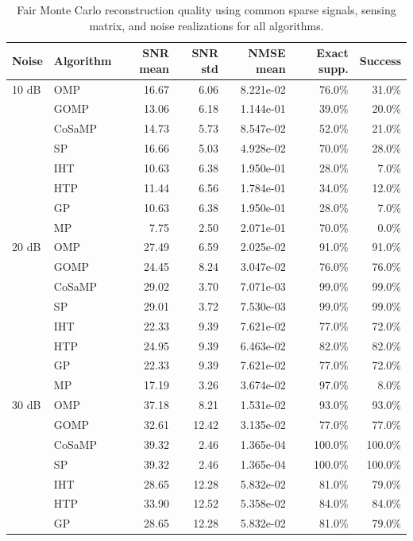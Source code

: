 \begin{table}[!t]
\centering
\caption{Fair Monte Carlo reconstruction quality using common sparse signals, sensing matrix, and noise realizations for all algorithms.}
\label{tab:fair_mc_quality}
\footnotesize
\begin{tabular}{llrrrrr}
\toprule
Noise & Algorithm & SNR mean & SNR std & NMSE mean & Exact supp. & Success \\
\midrule
10 dB & OMP & 16.67 & 6.06 & 8.221e-02 & 76.0\% & 31.0\% \\
 & GOMP & 13.06 & 6.18 & 1.144e-01 & 39.0\% & 20.0\% \\
 & CoSaMP & 14.73 & 5.73 & 8.547e-02 & 52.0\% & 21.0\% \\
 & SP & 16.66 & 5.03 & 4.928e-02 & 70.0\% & 28.0\% \\
 & IHT & 10.63 & 6.38 & 1.950e-01 & 28.0\% & 7.0\% \\
 & HTP & 11.44 & 6.56 & 1.784e-01 & 34.0\% & 12.0\% \\
 & GP & 10.63 & 6.38 & 1.950e-01 & 28.0\% & 7.0\% \\
 & MP & 7.75 & 2.50 & 2.071e-01 & 70.0\% & 0.0\% \\
\midrule
20 dB & OMP & 27.49 & 6.59 & 2.025e-02 & 91.0\% & 91.0\% \\
 & GOMP & 24.45 & 8.24 & 3.047e-02 & 76.0\% & 76.0\% \\
 & CoSaMP & 29.02 & 3.70 & 7.071e-03 & 99.0\% & 99.0\% \\
 & SP & 29.01 & 3.72 & 7.530e-03 & 99.0\% & 99.0\% \\
 & IHT & 22.33 & 9.39 & 7.621e-02 & 77.0\% & 72.0\% \\
 & HTP & 24.95 & 9.39 & 6.463e-02 & 82.0\% & 82.0\% \\
 & GP & 22.33 & 9.39 & 7.621e-02 & 77.0\% & 72.0\% \\
 & MP & 17.19 & 3.26 & 3.674e-02 & 97.0\% & 8.0\% \\
\midrule
30 dB & OMP & 37.18 & 8.21 & 1.531e-02 & 93.0\% & 93.0\% \\
 & GOMP & 32.61 & 12.42 & 3.135e-02 & 77.0\% & 77.0\% \\
 & CoSaMP & 39.32 & 2.46 & 1.365e-04 & 100.0\% & 100.0\% \\
 & SP & 39.32 & 2.46 & 1.365e-04 & 100.0\% & 100.0\% \\
 & IHT & 28.65 & 12.28 & 5.832e-02 & 81.0\% & 79.0\% \\
 & HTP & 33.90 & 12.52 & 5.358e-02 & 84.0\% & 84.0\% \\
 & GP & 28.65 & 12.28 & 5.832e-02 & 81.0\% & 79.0\% \\

\end{tabular}
\end{table}
